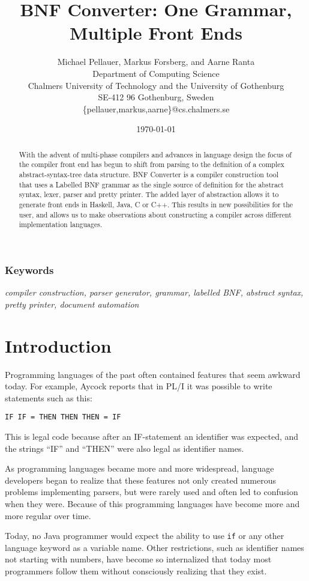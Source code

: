 \documentclass{llncs}
\title{{\Large \bf BNF Converter: One Grammar, Multiple Front Ends}}
\author{Michael Pellauer, Markus Forsberg, and Aarne Ranta \\
  Department of Computing Science \\
  Chalmers University of Technology and the University of Gothenburg \\
  SE-412 96 Gothenburg, Sweden\\
  \{pellauer,markus,aarne\}@cs.chalmers.se}
\date{\today}
\begin{document}
\maketitle


\begin{abstract}
With the advent of multi-phase compilers and advances in language design the focus of the compiler front end has begun to shift from parsing to the definition of a complex abstract-syntax-tree data structure. BNF Converter is a compiler construction tool that uses a Labelled BNF grammar as the single source of definition for the abstract syntax, lexer, parser and pretty printer. The added layer of abstraction allows it to generate front ends in Haskell, Java, C or C++. This results in new possibilities for the user, and allows us to make observations about constructing a compiler across different implementation languages.
\end{abstract}

\subsubsection*{Keywords}

\textit{compiler construction, parser generator, grammar, labelled BNF, 
        abstract syntax, pretty printer, document automation}


\section{Introduction}

Programming languages of the past often contained features that seem awkward today. For example, Aycock \cite{horspool} reports that in PL/I it was possible to write statements such as this:
\begin{center}
{\tt IF IF = THEN THEN THEN = IF}
\end{center}
This is legal code because after an IF-statement an identifier was expected, and the strings ``IF'' and ``THEN'' were also legal as identifier names. 

As programming languages became more and more widespread, language developers began to realize
that these features not only created numerous problems implementing parsers,
but were rarely used and often led to confusion when they were. Because of this programming languages have become more and more regular over time.

Today, no Java programmer would expect the ability to use \texttt{if} or any other language keyword as a variable name. Other restrictions, such as identifier names not starting with numbers, have become so internalized that today most programmers follow them without consciously realizing that they exist.
\end{document}
